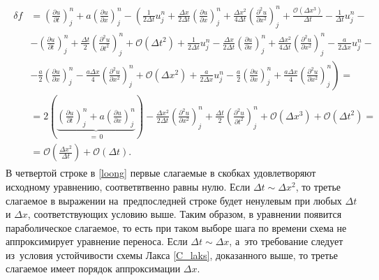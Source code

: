 \documentclass[12pt,a4paper]{article}
\begin{document}
	\begin{align}\label{loong}
		\begin{split}
			\delta f &= \left(\frac{\partial u}{\partial t}\right)_j^n + a \left(\frac{\partial u}{\partial x}\right)_j^n - \left(\frac{1}{2\Delta t}u_j^n\right. + \frac{\Delta x}{2 \Delta t}\left(\frac{\partial u}{\partial x}\right)_j^n + \frac{\Delta x^2}{4 \Delta t}\left(\frac{\partial^2 u}{\partial x^2}\right)_j^n + \frac{\mathcal{O}\left(\Delta x^3\right)}{\Delta t} -\frac{1}{\Delta t} u_j^n -\\ &- \left(\frac{\partial u}{\partial t}\right)_j^n + \frac{\Delta t}{2} \left( \frac{\partial^2 u}{\partial t^2}\right)_j^n + \mathcal{O}\left(\Delta t^2\right) + \frac{1}{2\Delta t}u_j^n - \frac{\Delta x}{2 \Delta t}\left(\frac{\partial u}{\partial x}\right)_j^n + \frac{\Delta x^2}{4 \Delta t}\left(\frac{\partial^2 u}{\partial x^2}\right)_j^n - \frac{a}{2\Delta x}u_j^n -\\ 
			&- \frac{a}{2}\left(\frac{\partial u}{\partial x}\right)_j^n - \frac{a\Delta x}{4}\left(\frac{\partial^2 u}{\partial x^2}\right)_j^n + \mathcal{O}\left(\Delta x^2\right) + \frac{a}{2\Delta x}u_j^n - \frac{a}{2}\left(\frac{\partial u}{\partial x}\right)_j^n + \left.\frac{a\Delta x}{4}\left(\frac{\partial^2 u}{\partial x^2}\right)_j^n\right) = \\
			&= 2\left(\underbrace{\left(\frac{\partial u}{\partial t}\right)_j^n + a \left(\frac{\partial u}{\partial x}\right)_j^n}_{ =\,0}\right)  - \frac{\Delta x^2}{2 \Delta t}\left(\frac{\partial^2 u}{\partial x^2}\right)_j^n + \frac{\Delta t}{2} \left( \frac{\partial^2 u}{\partial t^2}\right)_j^n + \mathcal{O}\left(\Delta x^3\right) + \mathcal{O}\left(\Delta t^2\right) =\\ &= \mathcal{O}\left(\frac{\Delta x^2}{\Delta t}\right) + \mathcal{O}(\Delta t).
		\end{split}
	\end{align}
	В четвертой строке в \eqref{loong} первые слагаемые в скобках удовлетворяют исходному уравнению, соответвтвенно равны нулю. Если $\Delta t \sim \Delta x^2$, то третье слагаемое в выражении на~предпоследней строке будет ненулевым при любых $\Delta t$ и $\Delta x$, соответствующих условию выше. Таким образом, в уравнении появится параболическое слагаемое, то есть при таком выборе шага по времени схема не аппроксимирует уравнение переноса. Если $\Delta t \sim \Delta x$, а~это требование следует из~условия устойчивости схемы Лакса \eqref{C_laks}, доказанного выше, то третье слагаемое имеет порядок аппроксимации $\Delta x$.
	
\end{document}
